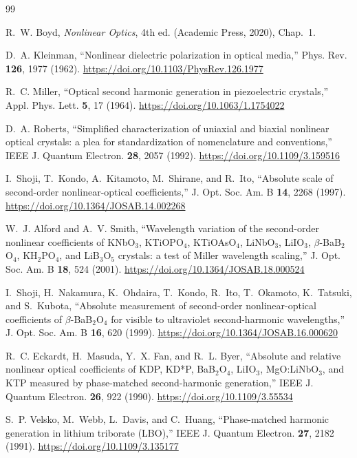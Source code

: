 \documentclass[aps,pra,preprint,amsmath,amssymb,nofootinbib,superscriptaddress]{revtex4-2}
\begin{document}
\begin{thebibliography}{99}

 R.~W. Boyd, \emph{Nonlinear Optics}, 4th ed. (Academic Press, 2020), Chap.~1.

 D.~A. Kleinman, ``Nonlinear dielectric polarization in optical media,''
Phys. Rev. \textbf{126}, 1977 (1962). \url{https://doi.org/10.1103/PhysRev.126.1977}

 R.~C. Miller, ``Optical second harmonic generation in piezoelectric crystals,''
Appl. Phys. Lett. \textbf{5}, 17 (1964). \url{https://doi.org/10.1063/1.1754022}

 D.~A. Roberts, ``Simplified characterization of uniaxial and biaxial nonlinear optical crystals: a plea for standardization of nomenclature and conventions,''
IEEE J. Quantum Electron. \textbf{28}, 2057 (1992). \url{https://doi.org/10.1109/3.159516}

 I.~Shoji, T.~Kondo, A.~Kitamoto, M.~Shirane, and R.~Ito, ``Absolute scale of second-order nonlinear-optical coefficients,''
J. Opt. Soc. Am. B \textbf{14}, 2268 (1997). \url{https://doi.org/10.1364/JOSAB.14.002268}

 W.~J. Alford and A.~V. Smith, ``Wavelength variation of the second-order nonlinear coefficients of KNbO$_3$, KTiOPO$_4$, KTiOAsO$_4$, LiNbO$_3$, LiIO$_3$, $\beta$-BaB$_2$O$_4$, KH$_2$PO$_4$, and LiB$_3$O$_5$ crystals: a test of Miller wavelength scaling,''
J. Opt. Soc. Am. B \textbf{18}, 524 (2001). \url{https://doi.org/10.1364/JOSAB.18.000524}

 I.~Shoji, H.~Nakamura, K.~Ohdaira, T.~Kondo, R.~Ito, T.~Okamoto, K.~Tatsuki, and S.~Kubota, ``Absolute measurement of second-order nonlinear-optical coefficients of $\beta$-BaB$_2$O$_4$ for visible to ultraviolet second-harmonic wavelengths,'' J. Opt. Soc. Am. B \textbf{16}, 620 (1999). \url{https://doi.org/10.1364/JOSAB.16.000620}

 R.~C. Eckardt, H.~Masuda, Y.~X. Fan, and R.~L. Byer, ``Absolute and relative nonlinear optical coefficients of KDP, KD*P, BaB$_2$O$_4$, LiIO$_3$, MgO:LiNbO$_3$, and KTP measured by phase-matched second-harmonic generation,'' IEEE J. Quantum Electron. \textbf{26}, 922 (1990). \url{https://doi.org/10.1109/3.55534}

 S.~P. Velsko, M.~Webb, L.~Davis, and C.~Huang, ``Phase-matched harmonic generation in lithium triborate (LBO),'' IEEE J. Quantum Electron. \textbf{27}, 2182 (1991). \url{https://doi.org/10.1109/3.135177}


\end{thebibliography}
\end{document}
